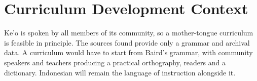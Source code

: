 \documentclass[12pt]{article}
\begin{document}
\section{Curriculum Development Context}
Ke'o is spoken by all members of its community, so a mother-tongue curriculum is feasible in principle. The sources found provide only a grammar and archival data. A curriculum would have to start from Baird's grammar, with community speakers and teachers producing a practical orthography, readers and a dictionary. Indonesian will remain the language of instruction alongside it.
\end{document}
